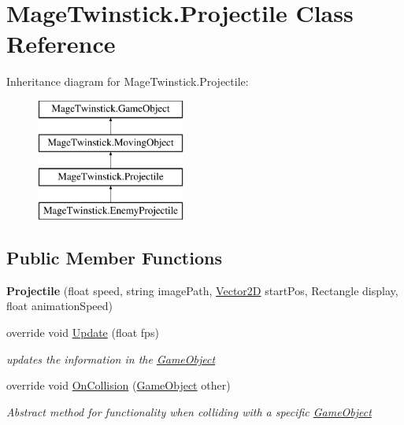 \hypertarget{class_mage_twinstick_1_1_projectile}{}\section{Mage\+Twinstick.\+Projectile Class Reference}
\label{class_mage_twinstick_1_1_projectile}
Inheritance diagram for Mage\+Twinstick.\+Projectile\+:\begin{figure}[H]
\begin{center}
\leavevmode
\includegraphics[height=4.000000cm]{class_mage_twinstick_1_1_projectile}
\end{center}
\end{figure}
\subsection*{Public Member Functions}
\begin{DoxyCompactItemize}
\item 
\hypertarget{class_mage_twinstick_1_1_projectile_a2e18fb2d662c973c867069a248b5a5ed}{}{\bfseries Projectile} (float speed, string image\+Path, \hyperlink{class_mage_twinstick_1_1_vector2_d}{Vector2\+D} start\+Pos, Rectangle display, float animation\+Speed)\label{class_mage_twinstick_1_1_projectile_a2e18fb2d662c973c867069a248b5a5ed}

\item 
override void \hyperlink{class_mage_twinstick_1_1_projectile_a9208eff25bc92289191d5470bbc7015a}{Update} (float fps)
\begin{DoxyCompactList}\small\item\em updates the information in the \hyperlink{class_mage_twinstick_1_1_game_object}{Game\+Object} \end{DoxyCompactList}\item 
override void \hyperlink{class_mage_twinstick_1_1_projectile_ad646d013997eceb12a0ac2f5df56d3bb}{On\+Collision} (\hyperlink{class_mage_twinstick_1_1_game_object}{Game\+Object} other)
\begin{DoxyCompactList}\small\item\em Abstract method for functionality when colliding with a specific \hyperlink{class_mage_twinstick_1_1_game_object}{Game\+Object} \end{DoxyCompactList}\end{DoxyCompactItemize}
